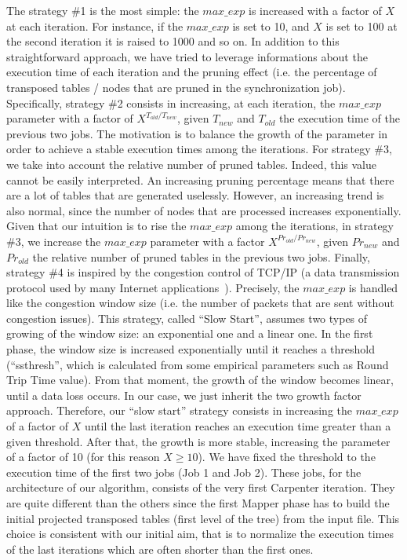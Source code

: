 The strategy \#1 is the most simple: the $max\_exp$ is increased with a factor of $X$ at each iteration. For instance, if the $max\_exp$ is set to 10, and $X$ is set to 100 at the second iteration it is raised to 1000 and so on.
In addition to this straightforward approach, we have tried to leverage informations about the execution time of each iteration and the pruning effect (i.e. the percentage of transposed tables / nodes that are pruned in the synchronization job). 
Specifically, strategy \#2 consists in increasing, at each iteration, the $max\_exp$ parameter with a factor of  $X^{T_{old} / T_{new}}$, given $T_{new}$ and  $T_{old}$ the execution time of the previous two jobs. The motivation is to balance the growth of the parameter in order to achieve a stable execution times among the iterations.  
For strategy \#3, we take into account the relative number of pruned tables. Indeed, this value cannot be easily interpreted. An increasing pruning percentage means that there are a lot of tables that are generated uselessly. However, an increasing trend is also normal, since the number of nodes that are processed increases exponentially. Given that our intuition is to rise the  $max\_exp$ among the iterations, in strategy \#3, we increase the $max\_exp$ parameter with a factor $X^{Pr_{old} / Pr_{new}}$, given $Pr_{new}$ and  $Pr_{old}$ the relative number of pruned tables in the previous two jobs. 
Finally, strategy \#4 is inspired by the congestion control of TCP/IP (a data transmission protocol used by many Internet applications~\cite{Jacobson:1988:CAC:52325.52356}). Precisely, the $max\_exp$ is handled like the congestion window size (i.e. the number of packets that are sent without congestion issues).
This strategy, called ``Slow Start'', assumes two types of growing of the window size: an exponential one and a linear one. In the first phase, the window size is increased exponentially until it reaches a threshold (``ssthresh'', which is calculated from some empirical parameters such as Round Trip Time value). From that moment, the growth of the window becomes linear, until a data loss occurs.
In our case, we just inherit the two growth factor approach. Therefore, our ``slow start'' strategy consists in increasing the $max\_exp$ of a factor of $X$ until the last iteration reaches an execution time greater than a given threshold. After that, the growth is more stable, increasing the parameter of a factor of 10 (for this reason $X\geq10$).
We have fixed the threshold to the execution time of the first two jobs (Job 1 and Job 2). These jobs, for the architecture of our algorithm, consists of the very first Carpenter iteration. They are quite different than the others since the first Mapper phase has to build the initial projected transposed tables (first level of the tree) from the input file. This choice is consistent with our initial aim, that is to normalize the execution times of the last iterations which are often shorter than the first ones.
